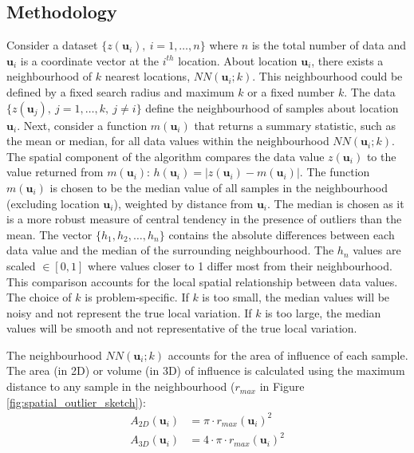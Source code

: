 \subsection{Methodology}
\label{subsec:02methodology}

Consider a dataset $\{z(\mathbf{u}_{i}), \ i = 1, \dots, n\}$ where $n$ is the total number of data and $\mathbf{u}_{i}$ is a coordinate vector at the $i^{th}$ location. About location $\mathbf{u}_{i}$, there exists a neighbourhood of $k$ nearest locations, $NN(\mathbf{u}_{i}; k)$. This neighbourhood could be defined by a fixed search radius and maximum $k$ or a fixed number $k$. The data $\{z(\mathbf{u}_{j}), \ j = 1, \dots, k, \ j \neq i \}$ define the neighbourhood of samples about location $\mathbf{u}_{i}$. Next, consider a function $m(\mathbf{u}_{i})$ that returns a summary statistic, such as the mean or median, for all data values within the neighbourhood $NN(\mathbf{u}_{i}; k)$. The spatial component of the algorithm compares the data value $z(\mathbf{u}_{i})$ to the value returned from $m(\mathbf{u}_{i})$: $h(\mathbf{u}_{i}) = |z(\mathbf{u}_{i}) - m(\mathbf{u}_{i})|$. The function $m(\mathbf{u}_{i})$ is chosen to be the median value of all samples in the neighbourhood (excluding location $\mathbf{u}_{i}$), weighted by distance from $\mathbf{u}_{i}$. The median is chosen as it is a more robust measure of central tendency in the presence of outliers than the mean. The vector $\{h_{1}, h_{2}, \dots, h_{n}\}$ contains the absolute differences between each data value and the median of the surrounding neighbourhood. The $h_{n}$ values are scaled $\in [0,1]$ where values closer to 1 differ most from their neighbourhood. This comparison accounts for the local spatial relationship between data values. The choice of $k$ is problem-specific. If $k$ is too small, the median values will be noisy and not represent the true local variation. If $k$ is too large, the median values will be smooth and not representative of the true local variation.

The neighbourhood $NN(\mathbf{u}_{i}; k)$ accounts for the area of influence of each sample. The area (in \acrshort{2D}) or volume (in \acrshort{3D}) of influence is calculated using the maximum distance to any sample in the neighbourhood ($r_{max}$ in Figure \ref{fig:spatial_outlier_sketch}):
\begin{align}
    A_{2D}(\mathbf{u}_{i}) & = \pi \cdot r_{max}(\mathbf{u}_{i})^{2}         \\
    A_{3D}(\mathbf{u}_{i}) & = 4 \cdot \pi \cdot r_{max}(\mathbf{u}_{i})^{2}
    \label{eq:aoi}
\end{align}

